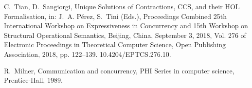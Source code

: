 \documentclass[GCNS]{yincog}
\theoremstyle{remark}
\theoremstyle{theorem}
\theoremstyle{remark}
\begin{document}
%
%
\begin{backmatter}%
\begin{thebibliography}{}


\begin{bsubitem}
\begin{bcontribution}%
\end{bcontribution}
\begin{bhost}
\begin{beditedbook}
\end{beditedbook}
\end{bhost}
\end{bsubitem}
%
\OrigBibText
C.~Tian, D.~Sangiorgi, {Unique Solutions of Contractions, CCS, and their
HOL Formalisation}, in: J.~A. P\'erez, S.~Tini (Eds.), \textrm{Proceedings
Combined 25th International Workshop on} Expressiveness in Concurrency
\textrm{and 15th Workshop on} Structural Operational Semantics, \textrm{Beijing,
China, September 3, 2018}, Vol. 276 of Electronic Proceedings in Theoretical
Computer Science, Open Publishing Association, 2018, pp. 122--139.
10.4204/EPTCS.276.10.
\endOrigBibText
{}%
\endbibitem

\begin{bsubitem}
\begin{bcontribution}%
\end{bcontribution}
\begin{bhost}
\begin{bbook}
\end{bbook}
\end{bhost}
\end{bsubitem}
%
\OrigBibText
R.~Milner, Communication and concurrency, {PHI} Series in computer science,
Prentice-Hall, 1989.
\endOrigBibText
{}%
\endbibitem


\end{thebibliography}
\end{backmatter}
\end{document}
